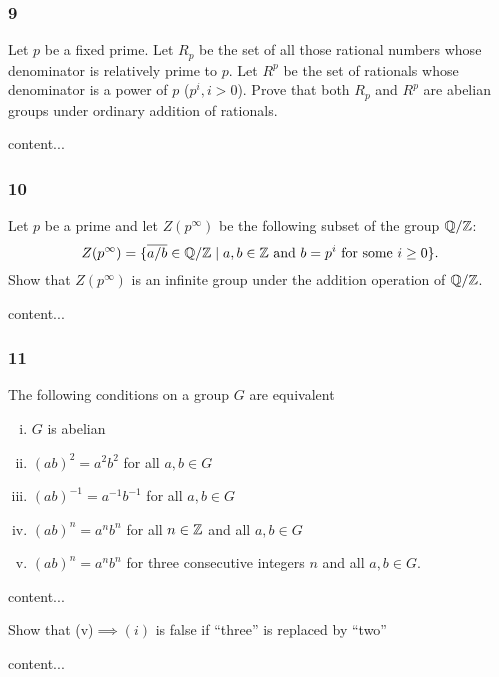 \subsubsection*{9}
\begin{graybox}
	Let $p$ be a fixed prime. Let $R_p$ be the set of all those rational numbers whose denominator is relatively prime to $p$. Let $R^p$ be the set of rationals whose denominator is a power of $p$ ($p^i, i > 0$). Prove that both $R_p$ and $R^p$ are abelian groups under ordinary addition of rationals. 
\end{graybox}
\begin{solution}
	content...
\end{solution}

\subsubsection*{10}
\begin{graybox}
	Let $p$ be a prime and let $Z(p^\infty)$ be the following subset of the group $\mathbb{Q}/\mathbb{Z}$:
	$$
		Z(p^\infty) = \{\overline{a/b} \in \mathbb{Q}/\mathbb{Z} \mid a,b \in \mathbb{Z} \text{ and } b = p^i \text{ for some } i \geq 0\}.
	$$
	Show that $Z(p^\infty)$ is an infinite group under the addition operation of $\mathbb{Q}/\mathbb{Z}$.
\end{graybox}
\begin{solution}
	content...
\end{solution}

\subsubsection*{11}
\begin{graybox}
	The following conditions on a group $G$ are equivalent
	\begin{enumerate}[(i)]
		\item $G$ is abelian
		\item $(ab)^2 = a^2b^2$ for all $a,b \in G$
		\item $(ab)^{-1} = a^{-1}b^{-1}$ for all $a,b \in G$
		\item $(ab)^n = a^nb^n$ for all $n \in \mathbb{Z}$ and all $a, b \in G$
		\item $(ab)^n = a^nb^n$ for three consecutive integers $n$ and all $a,b \in G$.
	\end{enumerate}
\end{graybox}
\begin{solution}
	content...
\end{solution}
\begin{lightgraybox}
	Show that (v)$\implies(i)$ is false if ``three'' is replaced by ``two''
\end{lightgraybox}
\begin{solution}
	content...
\end{solution}

